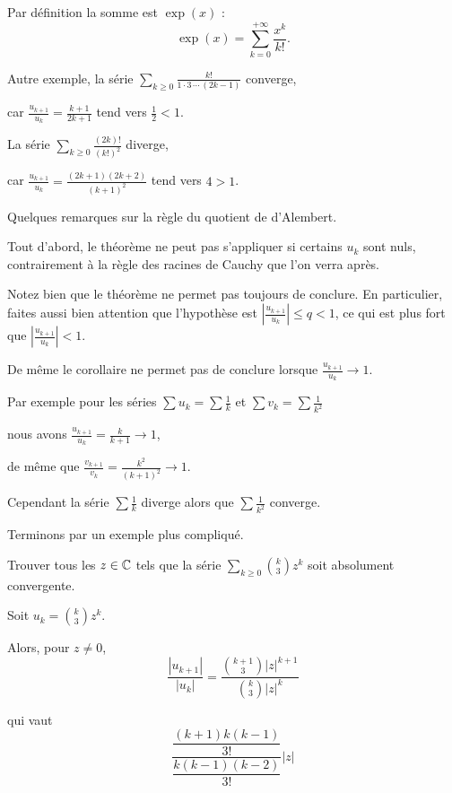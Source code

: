 \change
Par définition la somme est $\exp(x)$ : 
$$\exp(x) = \sum_{k=0}^{+\infty} \frac{x^k}{k!}.$$

\change
Autre exemple, la série $\displaystyle\sum_{k\ge0} \frac{k!}{1\cdot 3\,\cdots\,(2k-1)}$ converge,

\change
car $\frac{u_{k+1}}{u_k}=\frac{k+1}{2k+1}$ tend vers $\frac{1}{2}<1$.
  
\change
La série $\displaystyle\sum_{k\ge0} \frac{(2k)!}{(k!)^2}$ diverge, 

\change
car $\frac{u_{k+1}}{u_k}=\frac{(2k+1)(2k+2)}{(k+1)^2}$ tend vers $4>1$.

\diapo

Quelques remarques sur la règle du quotient de d'Alembert.

\change
Tout d'abord, le théorème ne peut pas s'appliquer si certains $u_k$ sont nuls, contrairement à la règle des racines de Cauchy que l'on verra après.
  
\change
Notez bien que le théorème ne permet pas toujours de conclure. En particulier, faites aussi bien attention que l'hypothèse est  $\left|\frac{u_{k+1}}{u_k}\right| \le q <1$, ce qui est plus fort que $\left|\frac{u_{k+1}}{u_k}\right| <1$.
  
\change
De même le corollaire ne permet pas de conclure lorsque $\frac{u_{k+1}}{u_k} \to 1$.

\change
Par exemple pour les séries $\sum u_k= \sum \frac{1}{k}$ et $\sum v_k = \sum \frac{1}{k^2}$ 

\change
nous avons $\frac{u_{k+1}}{u_k} = \frac{k}{k+1} \to 1$,

\change
de même que $\frac{v_{k+1}}{v_k} = \frac{k^2}{(k+1)^2 } \to 1$.

\change
Cependant la série $\sum \frac{1}{k}$ diverge alors que $\sum \frac{1}{k^2}$ converge.


\diapo

Terminons par un exemple plus compliqué.

Trouver tous les $z\in \mathbb{C}$ tels que la série 
$\sum_{k\ge0} \binom{k}{3} z^k$ soit absolument convergente.
\medskip

\change
Soit $u_k=\binom{k}{3} z^k$. 

\change
Alors, pour $z\neq0$,
$$\dfrac{|u_{k+1}|}{|u_k|}=\dfrac{\binom{k+1}{3}|z|^{k+1}}{\binom{k}{3}|z|^{k}}$$

\change
qui vaut
$$
\dfrac{\dfrac{(k+1)k(k-1)}{3!}}{\dfrac{k(k-1)(k-2)}{3!}}|z|$$


